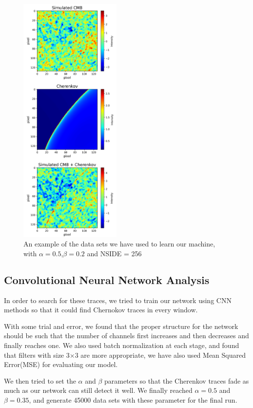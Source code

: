 \documentclass[10pt, english, pra,aps,twocolumn,floatfix,superscriptaddress]{revtex4-2}
\begin{document}
\begin{figure}
    \centering
    \includegraphics[width=0.45\textwidth]{sample_data.png}
    \caption{An example of the data sets we have used to learn our machine, with $\alpha = 0.5$,$\beta=0.2$ and NSIDE = 256}
    \label{fig:data}
\end{figure}

\subsection{Convolutional Neural Network Analysis}
In order to search for these traces, we tried to train our network using CNN methods so that it could find Chernokov traces in every window.

With some trial and error, we found that the proper structure for the network should be such that the number of channels first increases and then decreases and finally reaches one. We also used batch normalization at each stage, and found that filters with size 3$\times$3 are more appropriate, we have also used Mean Squared Error(MSE) for evaluating our model.

 We then tried to set the $\alpha$ and $\beta$ parameters so that the Cherenkov traces fade as much as our network can still detect it well. We finally reached $\alpha = 0.5$ and $\beta = 0.35$, and generate 45000 data sets with these parameter for the final run.
 
\end{document}
